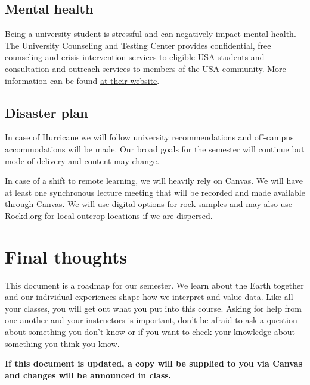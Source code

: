 \documentclass[11pt,]{article}
\begin{document}
\hypertarget{mental-health}{%
\subsection{Mental health}\label{mental-health}}

Being a university student is stressful and can negatively impact mental
health. The University Counseling and Testing Center provides
confidential, free counseling and crisis intervention services to
eligible USA students and consultation and outreach services to members
of the USA community. More information can be found
\href{https://www.southalabama.edu/departments/counseling/}{at their
website}.

\hypertarget{disaster-plan}{%
\subsection{Disaster plan}\label{disaster-plan}}

In case of Hurricane we will follow university recommendations and
off-campus accommodations will be made. Our broad goals for the semester
will continue but mode of delivery and content may change.

In case of a shift to remote learning, we will heavily rely on Canvas.
We will have at least one synchronous lecture meeting that will be
recorded and made available through Canvas. We will use digital options
for rock samples and may also use \href{https://rockd.org/}{Rockd.org}
for local outcrop locations if we are dispersed.

\hypertarget{final-thoughts}{%
\section{Final thoughts}\label{final-thoughts}}

This document is a roadmap for our semester. We learn about the Earth
together and our individual experiences shape how we interpret and value
data. Like all your classes, you will get out what you put into this
course. Asking for help from one another and your instructors is
important, don't be afraid to ask a question about something you don't
know or if you want to check your knowledge about something you think
you know.

\textbf{If this document is updated, a copy will be supplied to you via
Canvas and changes will be announced in class.}
\end{document}
